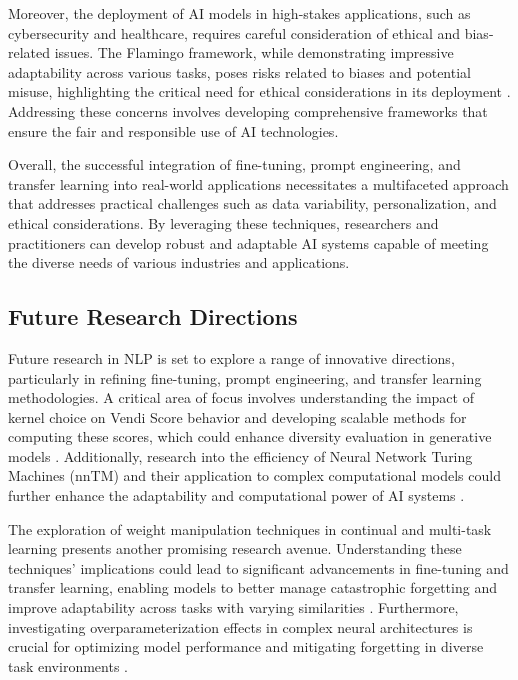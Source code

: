 Moreover, the deployment of AI models in high-stakes applications, such as cybersecurity and healthcare, requires careful consideration of ethical and bias-related issues. The Flamingo framework, while demonstrating impressive adaptability across various tasks, poses risks related to biases and potential misuse, highlighting the critical need for ethical considerations in its deployment \cite{alayrac2022flamingo}. Addressing these concerns involves developing comprehensive frameworks that ensure the fair and responsible use of AI technologies.



Overall, the successful integration of fine-tuning, prompt engineering, and transfer learning into real-world applications necessitates a multifaceted approach that addresses practical challenges such as data variability, personalization, and ethical considerations. By leveraging these techniques, researchers and practitioners can develop robust and adaptable AI systems capable of meeting the diverse needs of various industries and applications.



\subsection{Future Research Directions} \label{subsec:Future Research Directions}



Future research in NLP is set to explore a range of innovative directions, particularly in refining fine-tuning, prompt engineering, and transfer learning methodologies. A critical area of focus involves understanding the impact of kernel choice on Vendi Score behavior and developing scalable methods for computing these scores, which could enhance diversity evaluation in generative models \cite{pasarkar2024cousinsvendiscorefamily}. Additionally, research into the efficiency of Neural Network Turing Machines (nnTM) and their application to complex computational models could further enhance the adaptability and computational power of AI systems \cite{stogin2022provablystableneuralnetwork}.



The exploration of weight manipulation techniques in continual and multi-task learning presents another promising research avenue. Understanding these techniques' implications could lead to significant advancements in fine-tuning and transfer learning, enabling models to better manage catastrophic forgetting and improve adaptability across tasks with varying similarities . Furthermore, investigating overparameterization effects in complex neural architectures is crucial for optimizing model performance and mitigating forgetting in diverse task environments \cite{goldfarb2022analysiscatastrophicforgettingrandom}.



